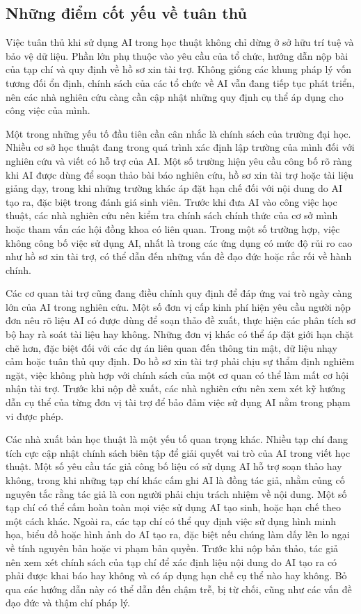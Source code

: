 \subsection{Những điểm cốt yếu về tuân thủ}

Việc tuân thủ khi sử dụng AI trong học thuật không chỉ dừng ở sở hữu trí tuệ và bảo vệ dữ liệu. Phần lớn phụ thuộc vào yêu cầu của tổ chức, hướng dẫn nộp bài của tạp chí và quy định về hồ sơ xin tài trợ. Không giống các khung pháp lý vốn tương đối ổn định, chính sách của các tổ chức về AI vẫn đang tiếp tục phát triển, nên các nhà nghiên cứu càng cần cập nhật những quy định cụ thể áp dụng cho công việc của mình.

Một trong những yếu tố đầu tiên cần cân nhắc là chính sách của trường đại học. Nhiều cơ sở học thuật đang trong quá trình xác định lập trường của mình đối với nghiên cứu và viết có hỗ trợ của AI. Một số trường hiện yêu cầu công bố rõ ràng khi AI được dùng để soạn thảo bài báo nghiên cứu, hồ sơ xin tài trợ hoặc tài liệu giảng dạy, trong khi những trường khác áp đặt hạn chế đối với nội dung do AI tạo ra, đặc biệt trong đánh giá sinh viên. Trước khi đưa AI vào công việc học thuật, các nhà nghiên cứu nên kiểm tra chính sách chính thức của cơ sở mình hoặc tham vấn các hội đồng khoa có liên quan. Trong một số trường hợp, việc không công bố việc sử dụng AI, nhất là trong các ứng dụng có mức độ rủi ro cao như hồ sơ xin tài trợ, có thể dẫn đến những vấn đề đạo đức hoặc rắc rối về hành chính.

Các cơ quan tài trợ cũng đang điều chỉnh quy định để đáp ứng vai trò ngày càng lớn của AI trong nghiên cứu. Một số đơn vị cấp kinh phí hiện yêu cầu người nộp đơn nêu rõ liệu AI có được dùng để soạn thảo đề xuất, thực hiện các phân tích sơ bộ hay rà soát tài liệu hay không. Những đơn vị khác có thể áp đặt giới hạn chặt chẽ hơn, đặc biệt đối với các dự án liên quan đến thông tin mật, dữ liệu nhạy cảm hoặc tuân thủ quy định. Do hồ sơ xin tài trợ phải chịu sự thẩm định nghiêm ngặt, việc không phù hợp với chính sách của một cơ quan có thể làm mất cơ hội nhận tài trợ. Trước khi nộp đề xuất, các nhà nghiên cứu nên xem xét kỹ hướng dẫn cụ thể của từng đơn vị tài trợ để bảo đảm việc sử dụng AI nằm trong phạm vi được phép.

Các nhà xuất bản học thuật là một yếu tố quan trọng khác. Nhiều tạp chí đang tích cực cập nhật chính sách biên tập để giải quyết vai trò của AI trong viết học thuật. Một số yêu cầu tác giả công bố liệu có sử dụng AI hỗ trợ soạn thảo hay không, trong khi những tạp chí khác cấm ghi AI là đồng tác giả, nhằm củng cố nguyên tắc rằng tác giả là con người phải chịu trách nhiệm về nội dung. Một số tạp chí có thể cấm hoàn toàn mọi việc sử dụng AI tạo sinh, hoặc hạn chế theo một cách khác. Ngoài ra, các tạp chí có thể quy định việc sử dụng hình minh họa, biểu đồ hoặc hình ảnh do AI tạo ra, đặc biệt nếu chúng làm dấy lên lo ngại về tính nguyên bản hoặc vi phạm bản quyền. Trước khi nộp bản thảo, tác giả nên xem xét chính sách của tạp chí để xác định liệu nội dung do AI tạo ra có phải được khai báo hay không và có áp dụng hạn chế cụ thể nào hay không. Bỏ qua các hướng dẫn này có thể dẫn đến chậm trễ, bị từ chối, cũng như các vấn đề đạo đức và thậm chí pháp lý.

